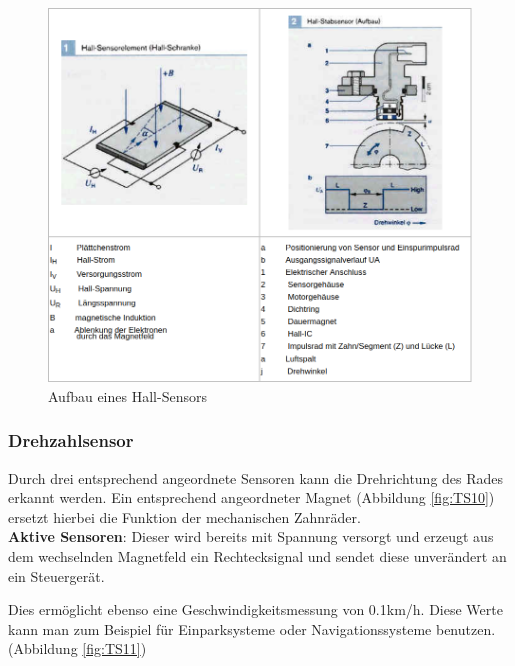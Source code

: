 \begin{flushleft}
					\begin{figure}[h]
						\centering
						\includegraphics[width=\textwidth]{hall.png}
						\caption[www.kfztech.de/kfztechnik/elo/sensoren/hallsensor.htm]{Aufbau eines Hall-Sensors}
	                \end{figure}
	                
	                \subsubsection{Drehzahlsensor}
	
					Durch drei entsprechend angeordnete Sensoren kann die Drehrichtung des Rades erkannt werden. Ein entsprechend angeordneter Magnet (Abbildung \ref{fig:TS10}) ersetzt hierbei die Funktion der mechanischen Zahnräder.\\
	                \textbf{Aktive Sensoren}: Dieser wird bereits mit Spannung versorgt und erzeugt aus dem wechselnden Magnetfeld ein Rechtecksignal und sendet diese unverändert an ein Steuergerät.
	                
					Dies ermöglicht ebenso eine Geschwindigkeitsmessung von 0.1km/h. Diese Werte kann man zum Beispiel für Einparksysteme oder Navigationssysteme benutzen.\cite{TS_drehzahl_sensor}
					(Abbildung \ref{fig:TS11})
	

\end{flushleft}
